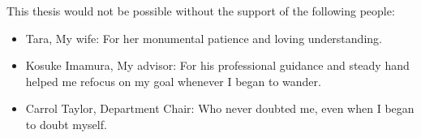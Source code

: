 This thesis would not be possible without the support of the following people:

\begin{itemize}
    \item Tara, My wife:  For her monumental patience and loving understanding.
    \item Kosuke Imamura, My advisor:  For his professional guidance and steady hand helped me refocus on my goal whenever I began to wander.
    \item Carrol Taylor, Department Chair:  Who never doubted me, even when I began to doubt myself.
\end{itemize}
